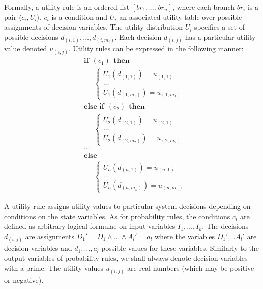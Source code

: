 Formally, a utility rule is an ordered list $[ br_1, \dots, br_n]$, where each branch $br_i$ is a pair $\langle c_i, U_i \rangle$, $c_i$ is a condition and $U_i$ an associated utility table over possible assignments of decision variables. The utility distribution $U_i$ specifies a set of possible decisions $d_{(i,1)}, \dots, d_{(i,m_i)}$.  Each decision $d_{(i,j)}$ has a particular utility value denoted $u_{(i,j)}$.  Utility rules can be expressed in the following manner:
\begin{equation}
\begin{aligned}
& \textbf{if} \ \ (c_{1}) \ \ \textbf{then} \\ 
& \;\;\;\;\; \begin{cases}
U_1(d_{(1,1)}) = u_{(1,1)} \\
 \dots \\
U_1(d_{(1,m_1)}) = u_{(1,m_1)} 
\end{cases} \\[3mm]
& \textbf{else if} \ \ (c_{2}) \ \ \textbf{then} \\ 
& \;\;\;\;\; \begin{cases}
U_2(d_{(2,1)}) = u_{(2,1)} \\
 \dots \\
U_2(d_{(2,m_2)}) = u_{(2,m_2)} 
\end{cases} \\
& \dots  \\
& \textbf{else} \\
& \;\;\;\;\; \begin{cases}
U_n(d_{(n,1)}) = u_{(n,1)} \\
 \dots \\
U_n(d_{(n,m_n)}) = u_{(n,m_n)}
\end{cases}
\end{aligned}
\end{equation}

A utility rule assigns utility values to particular system decisions depending on conditions on the state variables.  As for probability rules, the conditions $c_i$ are defined as arbitrary logical formulae on input variables $I_1, \dots, I_k$.  The decisions $d_{(i,j)}$ are assignments $D_1'\!=\!D_1 \land \dots \land A_{l}'\!=\!a_{l}$ where the variables $D_1',..A_{l}'$ are decision variables and $d_1, \dots, a_{l}$ possible values for these variables. Similarly to the output variables of probability rules, we shall always denote decision variables with a prime. The utility values $u_{(i,j)}$ are real numbers (which may be positive or negative).  

